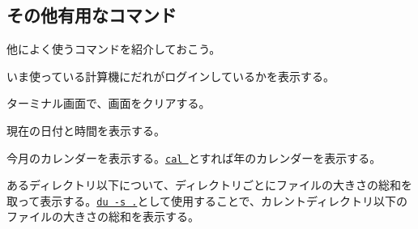 \subsection{その他有用なコマンド}
他によく使うコマンドを紹介しておこう。
\begin{itemize}

  いま使っている計算機にだれがログインしているかを表示する。
  

  ターミナル画面で、画面をクリアする。


  現在の日付と時間を表示する。


  今月のカレンダーを表示する。\underline{\tt cal \nendo}とすれば{\nendo}年のカレンダーを表示する。
  

  あるディレクトリ以下について、ディレクトリごとにファイルの大きさの総和を取って表示する。\underline{\tt du -s .}として使用することで、カレントディレクトリ以下のファイルの大きさの総和を表示する。

  \label{sect: tar}
  

\end{itemize}

